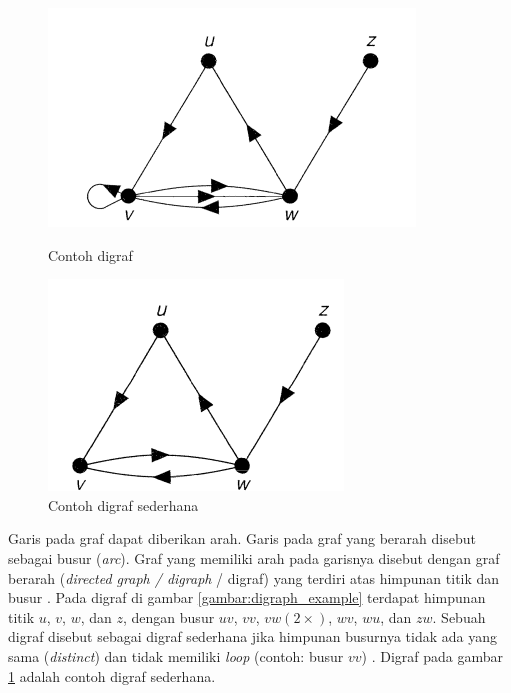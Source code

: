 \documentclass[
	a4paper, %
	12pt, %
	unnumberedsections, %
	twoside, %
]{LTJournalArticle}
\begin{document}
\begin{figure}[!htb]
\begin{minipage}{0.48\textwidth}
	\centering
	\includegraphics[width=.7\linewidth]{gambar/digraph_example}
	\caption{Contoh digraf \citep{wilson1996}}
	\label{gambar:digraph_example}
\end{minipage}\hfill
\begin{minipage}{0.48\textwidth}
	\centering
	\includegraphics[width=.7\linewidth]{gambar/simple_digraph_example}
	\caption{Contoh digraf sederhana \citep{wilson1996}}
	\label{gambar:simple_digraph_example}
\end{minipage}
\end{figure}

Garis pada graf dapat diberikan arah. Garis pada graf yang berarah disebut sebagai busur (\textit{arc}). Graf yang memiliki arah pada garisnya disebut dengan graf berarah (\textit{directed graph / digraph} / digraf) yang terdiri atas himpunan titik dan busur \citep{wilson1996}. Pada digraf di gambar \ref{gambar:digraph_example} terdapat himpunan titik $u$, $v$, $w$, dan $z$, dengan busur $uv$, $vv$, $vw (2\times)$, $wv$, $wu$, dan $zw$. Sebuah digraf disebut sebagai digraf sederhana jika himpunan busurnya tidak ada yang sama (\textit{distinct}) dan tidak memiliki \textit{loop} (contoh: busur $vv$) \citep{wilson1996}. Digraf pada gambar \ref{gambar:simple_digraph_example} adalah contoh digraf sederhana.
\end{document}
